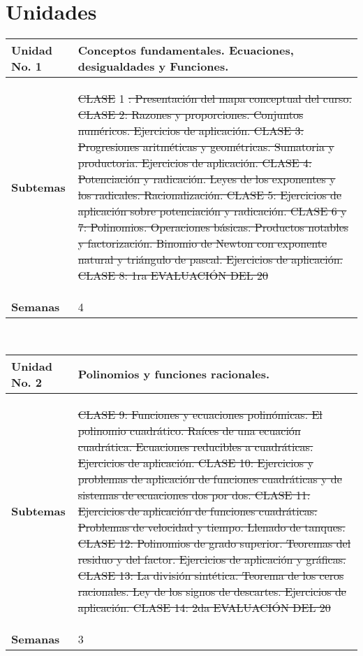 \documentclass[11pt]{article}
\providecommand{\DIFaddtex}[1]{{\protect\color{blue}\uwave{#1}}} %
\providecommand{\DIFdeltex}[1]{{\protect\color{red}\sout{#1}}}                      %
\providecommand{\DIFaddbegin}{} %
\providecommand{\DIFaddend}{} %
\providecommand{\DIFdelbegin}{} %
\providecommand{\DIFdelend}{} %
\providecommand{\DIFadd}[1]{\texorpdfstring{\DIFaddtex{#1}}{#1}} %
\providecommand{\DIFdel}[1]{\texorpdfstring{\DIFdeltex{#1}}{}} %
\newcommand{\DIFscaledelfig}{0.5}
\newlength{\DIFdelgraphicswidth} %
\newlength{\DIFdelgraphicsheight} %
\newcommand{\DIFaddincludegraphics}[2][]{{\color{blue}\fbox{\DIFOincludegraphics[#1]{#2}}}} %
\newcommand{\DIFdelincludegraphics}[2][]{%
\sbox{\DIFdelgraphicsbox}{\DIFOincludegraphics[#1]{#2}}%
\settoboxwidth{\DIFdelgraphicswidth}{\DIFdelgraphicsbox} %
\settoboxtotalheight{\DIFdelgraphicsheight}{\DIFdelgraphicsbox} %
\scalebox{\DIFscaledelfig}{%
\parbox[b]{\DIFdelgraphicswidth}{\usebox{\DIFdelgraphicsbox}\\[-\baselineskip] \rule{\DIFdelgraphicswidth}{0em}}\llap{\resizebox{\DIFdelgraphicswidth}{\DIFdelgraphicsheight}{%
\setlength{\unitlength}{\DIFdelgraphicswidth}%
\begin{picture}(1,1)%
\thicklines\linethickness{2pt} %
{\color[rgb]{1,0,0}\put(0,0){\framebox(1,1){}}}%
{\color[rgb]{1,0,0}\put(0,0){\line( 1,1){1}}}%
{\color[rgb]{1,0,0}\put(0,1){\line(1,-1){1}}}%
\end{picture}%
}\hspace*{3pt}}} %
} %
\DeclareRobustCommand{\DIFaddbegin}{\DIFOaddbegin \let\includegraphics\DIFaddincludegraphics} %
\DeclareRobustCommand{\DIFaddend}{\DIFOaddend \let\includegraphics\DIFOincludegraphics} %
\DeclareRobustCommand{\DIFdelbegin}{\DIFOdelbegin \let\includegraphics\DIFdelincludegraphics} %
\DeclareRobustCommand{\DIFdelend}{\DIFOaddend \let\includegraphics\DIFOincludegraphics} %
\begin{document}
\section*{Unidades}
\noindent 
\begin{tabular}{R{0.16\textwidth} L{0.7\textwidth}} 
 \\ 
\toprule \textbf{Unidad No. 1} & Conceptos fundamentales. Ecuaciones, desigualdades y  Funciones. 
 \\ 
\midrule\textbf{Subtemas} & 
\begin{description}
 \item \DIFdelbegin \DIFdel{CLASE }\DIFdelend \DIFaddbegin \DIFadd{subtema 1 unidad }\DIFaddend 1 
\DIFdelbegin \DIFdel{: Presentación del mapa conceptual del curso. CLASE 2: Razones y proporciones. Conjuntos numéricos. Ejercicios de aplicación. CLASE 3: Progresiones aritméticas y geométricas. Sumatoria y productoria. Ejercicios de aplicación. CLASE 4: Potenciación y radicación. Leyes de los exponentes y los radicales. Racionalización. CLASE 5: Ejercicios de aplicación sobre potenciación y radicación. CLASE 6 y 7: Polinomios. Operaciones básicas. Productos notables y factorización. Binomio de Newton con exponente natural y triángulo de pascal. Ejercicios de aplicación. CLASE 8: 1ra EVALUACIÓN DEL 20%
}\DIFdelend \end{description}
 \\ 
\textbf{Semanas} & 4 
\end{tabular} 
 \\ 
 \begin{tabular}{R{0.16\textwidth} L{0.7\textwidth}} 
 \\ 
\toprule \textbf{Unidad No. 2} & Polinomios y funciones racionales. 
 \\ 
\midrule\textbf{Subtemas} & 
\begin{description}
 \item \DIFdelbegin \DIFdel{CLASE 9: Funciones y ecuaciones polinómicas. El polinomio cuadrático. Raíces de una ecuación cuadrática. Ecuaciones reducibles a cuadráticas. Ejercicios de aplicación. CLASE 10: Ejercicios y problemas de aplicación de funciones cuadráticas y de sistemas de ecuaciones dos por dos. CLASE 11: Ejercicios de aplicación de funciones cuadráticas: Problemas de velocidad y tiempo. Llenado de tanques. CLASE 12: Polinomios de grado superior. Teoremas del residuo y del factor. Ejercicios de aplicación y gráficas. CLASE 13: La división sintética. Teorema de los ceros racionales. Ley de los signos de descartes. Ejercicios de aplicación. CLASE 14: 2da EVALUACIÓN DEL 20%
}\DIFdelend \DIFaddbegin \DIFadd{subtema 1 unidad 2 
}\DIFaddend \end{description}
 \\ 
\textbf{Semanas} & 3 
\end{tabular} 
\end{document}

